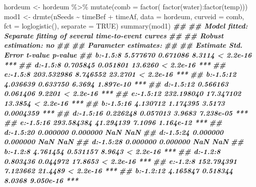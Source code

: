 \documentclass[
]{book}
\newenvironment{Shaded}{\begin{snugshade}}{\end{snugshade}}
\newcommand{\AttributeTok}[1]{\textcolor[rgb]{0.77,0.63,0.00}{#1}}
\newcommand{\ConstantTok}[1]{\textcolor[rgb]{0.00,0.00,0.00}{#1}}
\newcommand{\DocumentationTok}[1]{\textcolor[rgb]{0.56,0.35,0.01}{\textbf{\textit{#1}}}}
\newcommand{\FunctionTok}[1]{\textcolor[rgb]{0.00,0.00,0.00}{#1}}
\newcommand{\NormalTok}[1]{#1}
\newcommand{\OtherTok}[1]{\textcolor[rgb]{0.56,0.35,0.01}{#1}}
\newcommand{\SpecialCharTok}[1]{\textcolor[rgb]{0.00,0.00,0.00}{#1}}
\begin{document}
\begin{Shaded}
\begin{Highlighting}[]
\NormalTok{hordeum }\OtherTok{\textless{}{-}}\NormalTok{ hordeum }\SpecialCharTok{\%\textgreater{}\%} 
  \FunctionTok{mutate}\NormalTok{(}\AttributeTok{comb =} \FunctionTok{factor}\NormalTok{( }\FunctionTok{factor}\NormalTok{(water)}\SpecialCharTok{:}\FunctionTok{factor}\NormalTok{(temp)))}
\NormalTok{mod1 }\OtherTok{\textless{}{-}} \FunctionTok{drmte}\NormalTok{(nSeeds }\SpecialCharTok{\textasciitilde{}}\NormalTok{ timeBef }\SpecialCharTok{+}\NormalTok{ timeAf, }\AttributeTok{data =}\NormalTok{ hordeum,}
             \AttributeTok{curveid =}\NormalTok{ comb, }\AttributeTok{fct =} \FunctionTok{loglogistic}\NormalTok{(),}
             \AttributeTok{separate =} \ConstantTok{TRUE}\NormalTok{)}
\FunctionTok{summary}\NormalTok{(mod1)}
\DocumentationTok{\#\# }
\DocumentationTok{\#\# Model fitted: Separate fitting of several time{-}to{-}event curves}
\DocumentationTok{\#\# }
\DocumentationTok{\#\# Robust estimation: no }
\DocumentationTok{\#\# }
\DocumentationTok{\#\# Parameter estimates:}
\DocumentationTok{\#\# }
\DocumentationTok{\#\#             Estimate Std. Error t{-}value   p{-}value    }
\DocumentationTok{\#\# b:{-}1.5:8    5.577670   0.671086  8.3114 \textless{} 2.2e{-}16 ***}
\DocumentationTok{\#\# d:{-}1.5:8    0.705845   0.051801 13.6260 \textless{} 2.2e{-}16 ***}
\DocumentationTok{\#\# e:{-}1.5:8  203.532986   8.746552 23.2701 \textless{} 2.2e{-}16 ***}
\DocumentationTok{\#\# b:{-}1.5:12   4.036639   0.633750  6.3694 1.897e{-}10 ***}
\DocumentationTok{\#\# d:{-}1.5:12   0.566163   0.061406  9.2201 \textless{} 2.2e{-}16 ***}
\DocumentationTok{\#\# e:{-}1.5:12 232.198040  17.347102 13.3854 \textless{} 2.2e{-}16 ***}
\DocumentationTok{\#\# b:{-}1.5:16   4.130712   1.174395  3.5173 0.0004359 ***}
\DocumentationTok{\#\# d:{-}1.5:16   0.226248   0.057013  3.9683 7.238e{-}05 ***}
\DocumentationTok{\#\# e:{-}1.5:16 293.584384  41.294139  7.1096 1.164e{-}12 ***}
\DocumentationTok{\#\# d:{-}1.5:20   0.000000   0.000000     NaN       NaN    }
\DocumentationTok{\#\# d:{-}1.5:24   0.000000   0.000000     NaN       NaN    }
\DocumentationTok{\#\# d:{-}1.5:28   0.000000   0.000000     NaN       NaN    }
\DocumentationTok{\#\# b:{-}1.2:8    4.761454   0.531157  8.9643 \textless{} 2.2e{-}16 ***}
\DocumentationTok{\#\# d:{-}1.2:8    0.803436   0.044972 17.8653 \textless{} 2.2e{-}16 ***}
\DocumentationTok{\#\# e:{-}1.2:8  152.794391   7.123662 21.4489 \textless{} 2.2e{-}16 ***}
\DocumentationTok{\#\# b:{-}1.2:12   4.165847   0.518344  8.0368 9.050e{-}16 ***}

\end{Highlighting}
\end{Shaded}
\end{document}
